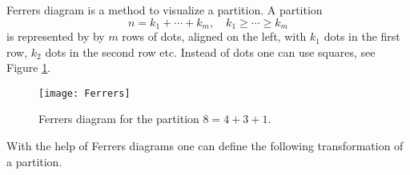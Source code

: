 

\setcounter{section}{3}
\setcounter{subsection}{6}
\setcounter{dfn}{12}

Ferrers diagram is a method to visualize a partition.
A partition
\[
n = k_1 + \cdots + k_m, \quad k_1 \ge \cdots \ge k_m
\]
is represented by by $m$ rows of dots, aligned on the left, with $k_1$ dots in the first row, $k_2$ dots in the second row etc.
Instead of dots one can use squares, see Figure \ref{fig:Ferrers}.

\begin{figure}[ht]
\begin{center}
\texttt{[image: Ferrers]}
\end{center}
\caption{Ferrers diagram for the partition $8 = 4 + 3 + 1$.}
\label{fig:Ferrers}
\end{figure}

With the help of Ferrers diagrams one can define the following transformation of a partition.



